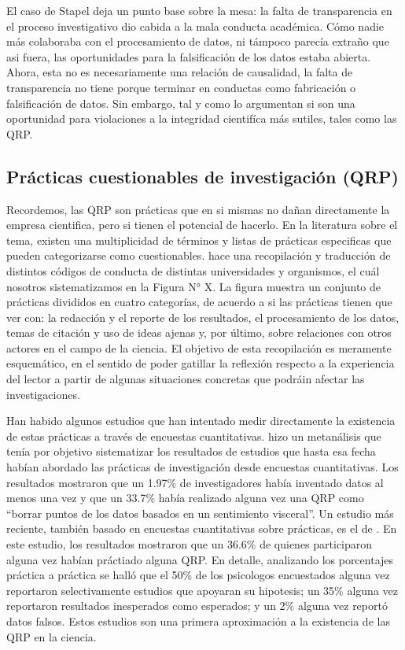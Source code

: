 \documentclass[
]{book}
\begin{document}
El caso de Stapel deja un punto base sobre la mesa: la falta de transparencia en el proceso investigativo dio cabida a la mala conducta académica. Cómo nadie más colaboraba con el procesamiento de datos, ni támpoco parecía extraño que asi fuera, las oportunidades para la falsificación de los datos estaba abierta. Ahora, esta no es necesariamente una relación de causalidad, la falta de transparencia no tiene porque terminar en conductas como fabricación o falsificación de datos. Sin embargo, tal y como lo argumentan \citep{oboyle_Chrysalis_2017} si son una oportunidad para violaciones a la integridad cientifíca más sutiles, tales como las QRP.

\hypertarget{pruxe1cticas-cuestionables-de-investigaciuxf3n-qrp}{%
\subsection{Prácticas cuestionables de investigación (QRP)}\label{pruxe1cticas-cuestionables-de-investigaciuxf3n-qrp}}

Recordemos, las QRP son prácticas que en si mismas no dañan directamente la empresa cientifica, pero si tienen el potencial de hacerlo. En la literatura sobre el tema, existen una multiplicidad de términos y listas de prácticas especificas que pueden categorizarse como cuestionables. \citet{abrilruiz_Manzanas_2019} hace una recopilación y traducción de distintos códigos de conducta de distintas universidades y organismos, el cuál nosotros sistematizamos en la Figura N° X. La figura muestra un conjunto de prácticas divididos en cuatro categorías, de acuerdo a si las prácticas tienen que ver con: la redacción y el reporte de los resultados, el procesamiento de los datos, temas de citación y uso de ideas ajenas y, por último, sobre relaciones con otros actores en el campo de la ciencia. El objetivo de esta recopilación es meramente esquemático, en el sentido de poder gatillar la reflexión respecto a la experiencia del lector a partir de algunas situaciones concretas que podráin afectar las investigaciones.

Han habido algunos estudios que han intentado medir directamente la existencia de estas prácticas a través de encuestas cuantitativas. \citet{fanelli_How_2009} hizo un metanálisis que tenía por objetivo sistematizar los resultados de estudios que hasta esa fecha habían abordado las prácticas de investigación desde encuestas cuantitativas. Los resultados mostraron que un 1.97\% de investigadores había inventado datos al menos una vez y que un 33.7\% había realizado alguna vez una QRP como ``borrar puntos de los datos basados en un sentimiento visceral''. Un estudio más reciente, también basado en encuestas cuantitativas sobre prácticas, es el de \citet{john_Measuring_2012}. En este estudio, los resultados mostraron que un 36.6\% de quienes participaron alguna vez habían práctiado alguna QRP. En detalle, analizando los porcentajes práctica a práctica se halló que el 50\% de los psicologos encuestados alguna vez reportaron selectivamente estudios que apoyaran su hipotesis; un 35\% alguna vez reportaron resultados inesperados como esperados; y un 2\% alguna vez reportó datos falsos. Estos estudios son una primera aproximación a la existencia de las QRP en la ciencia.
\end{document}
